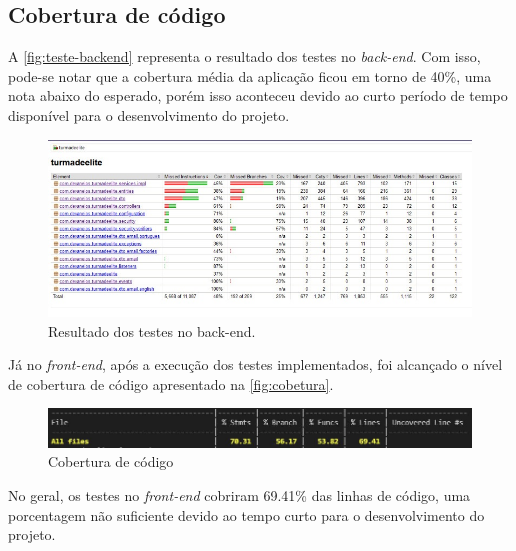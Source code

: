 \subsection{Cobertura de código}

A \autoref{fig:teste-backend} representa o resultado dos testes no \textit{\gls{back-end}}. Com isso, pode-se notar que a cobertura média da aplicação ficou em torno de 40\%, uma nota abaixo do esperado, porém isso aconteceu devido ao curto período de tempo disponível para o desenvolvimento do projeto.
\begin{figure}[htb]
    \centering
	\includegraphics[width=16cm]{imagens/TesteBackend.jpg}
	\caption{\label{fig:teste-backend} Resultado dos testes no back-end.}
\end{figure}

Já no \textit{\gls{front-end}}, após a execução dos testes implementados, foi alcançado o nível de cobertura de código apresentado na \autoref{fig:cobetura}.

\begin{figure}[htb]
    \centering
	\includegraphics[width=16cm]{imagens/ResultadoTestes.JPG}
	\caption{\label{fig:cobetura} Cobertura de código}
\end{figure}

No geral, os testes no \textit{\gls{front-end}} cobriram 69.41\% das linhas de código, uma  porcentagem não suficiente devido ao tempo curto para o desenvolvimento do projeto.